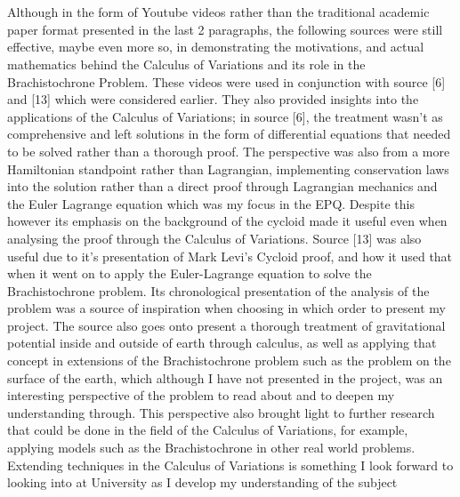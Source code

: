 \documentclass[12pt]{report}
\begin{document}
\begin{itemize}
    \\
    \\
    Although in the form of Youtube videos rather than the traditional academic paper format presented in the last 2 paragraphs, the following sources were still effective, maybe even more so, in demonstrating the motivations, and actual mathematics behind the Calculus of Variations and its role in the Brachistochrone Problem. These videos were used in conjunction with source [6] and [13] which were considered earlier. They also provided insights into the applications of the Calculus of Variations; in source [6], the treatment wasn't as comprehensive and left solutions in the form of differential equations that needed to be solved rather than a thorough proof. The perspective was also from a more Hamiltonian standpoint rather than Lagrangian, implementing conservation laws into the solution rather than a direct proof through Lagrangian mechanics and the Euler Lagrange equation which was my focus in the EPQ. Despite this however its emphasis on the background of the cycloid made it useful even when analysing the proof through the Calculus of Variations. Source [13] was also useful due to it's presentation of Mark Levi's Cycloid proof, and how it used that when it went on to apply the Euler-Lagrange equation to solve the Brachistochrone problem. Its chronological presentation of the analysis of the problem was a source of inspiration when choosing in which order to present my project. The source also goes onto present a thorough treatment of gravitational potential inside and outside of earth through calculus, as well as applying that concept in extensions of the Brachistochrone problem such as the  problem on the surface of the earth, which although I have not presented in the project, was an interesting perspective of the problem to read about and to deepen my understanding through. This perspective also brought light to further research that could be done in the field of the Calculus of Variations, for example, applying models such as the Brachistochrone in other real world problems. Extending techniques in the Calculus of Variations is something I look forward to looking into at University as I develop my understanding of the subject
    \\
    \\

\end{itemize}
\end{document}
